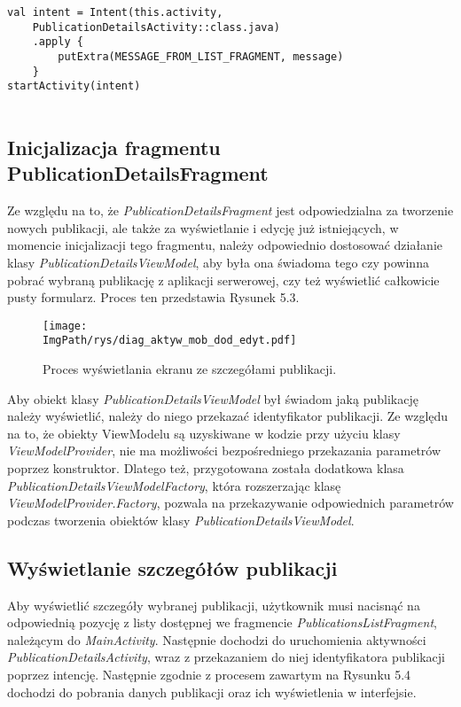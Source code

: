 \documentclass[a4paper,12pt,twoside,openany]{report}
\newcommand{\ImgPath}{.}
\begin{document}
\begin{lstlisting}[caption=Przełączanie się pomiędzy aktywnościami,label=code1,captionpos=b]
val intent = Intent(this.activity,
    PublicationDetailsActivity::class.java)
    .apply {
        putExtra(MESSAGE_FROM_LIST_FRAGMENT, message)
    }
startActivity(intent)
    
\end{lstlisting} 

\subsection{Inicjalizacja fragmentu PublicationDetailsFragment}
Ze względu na to, że \textit{PublicationDetailsFragment} jest odpowiedzialna za tworzenie nowych publikacji, ale także za wyświetlanie i edycję już istniejących, w momencie inicjalizacji tego fragmentu, należy odpowiednio dostosować działanie klasy \textit{PublicationDetailsViewModel}, aby była ona świadoma tego czy powinna pobrać wybraną publikację z aplikacji serwerowej, czy też wyświetlić całkowicie pusty formularz. Proces ten przedstawia Rysunek 5.3.

\begin{figure}[!htbp]
	\begin{center}
		\centering
		\texttt{[image: \\ImgPath/rys/diag\_aktyw\_mob\_dod\_edyt.pdf]}
	\end{center}
	\caption{Proces wyświetlania ekranu ze szczegółami publikacji.}
	\label{diagramAktywnosciMobDodEdyt}
\end{figure}


Aby obiekt klasy \textit{PublicationDetailsViewModel} był świadom jaką publikację należy wyświetlić, należy do niego przekazać identyfikator publikacji. Ze względu na to, że obiekty ViewModelu są uzyskiwane w kodzie przy użyciu klasy \textit{ViewModelProvider}, nie ma możliwości bezpośredniego przekazania parametrów poprzez konstruktor. Dlatego też, przygotowana została dodatkowa klasa \textit{PublicationDetailsViewModelFactory}, która rozszerzając klasę \textit{ViewModelProvider.Factory}, pozwala na przekazywanie odpowiednich parametrów podczas tworzenia obiektów klasy  \textit{PublicationDetailsViewModel}.



\subsection{Wyświetlanie szczegółów publikacji}
Aby wyświetlić szczegóły wybranej publikacji, użytkownik musi nacisnąć na odpowiednią pozycję z listy dostępnej we fragmencie \textit{PublicationsListFragment}, należącym do \textit{MainActivity}.  Następnie dochodzi do uruchomienia aktywności \textit{PublicationDetailsActivity}, wraz z przekazaniem do niej identyfikatora publikacji poprzez intencję. Następnie zgodnie z procesem zawartym na Rysunku 5.4 dochodzi do pobrania danych publikacji oraz ich wyświetlenia w interfejsie.
\end{document}
